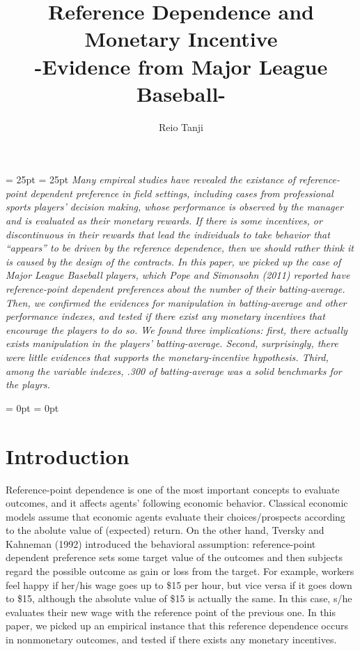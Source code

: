 \documentclass[dvipdfmx, 12pt]{article}
\begin{document}
\title{Reference Dependence and Monetary Incentive \\
-Evidence from Major League Baseball-}
\author{Reio Tanji}
\date{}
\maketitle

\leftskip = 25pt
\rightskip = 25pt
  \small
  \textit{
  Many empircal studies have revealed the existance of reference-point dependent preference in field settings, including cases from professional sports players' decision making, whose performance is observed by the manager and is evaluated as their monetary rewards. If there is some incentives, or discontinuous in their rewards that lead the individuals to take behavior that ``appears'' to be driven by the reference dependence, then we should rather think it is caused by the design of the contracts. In this paper, we picked up the case of Major League Baseball players, which Pope and Simonsohn (2011) reported have reference-point dependent preferences about the number of their batting-average. Then, we confirmed the evidences for manipulation in batting-average and other performance indexes, and tested if there exist any monetary incentives that encourage the players to do so. We found three implications: first, there actually exists manipulation in the players' batting-average. Second, surprisingly, there were little evidences that supports the monetary-incentive hypothesis. Third, among the variable indexes, .300 of batting-average was a solid benchmarks for the playrs.
  }

\leftskip = 0pt
\rightskip = 0pt
\normalsize


\section{Introduction}

Reference-point dependence is one of the most important concepts to evaluate outcomes, and it affects agents' following economic behavior. Classical economic models assume that economic agents evaluate their choices/prospects according to the abolute value of (expected) return. On the other hand, Tversky and Kahneman (1992) introduced the behavioral assumption: reference-point dependent preference sets some target value of the outcomes and then subjects regard the possible outcome as gain or loss from the target. For example, workers feel happy if her/his wage goes up to \$15 per hour, but vice versa if it goes down to \$15, although the absolute value of \$15 is actually the same. In this case, s/he evaluates their new wage with the reference point of the previous one. In this paper, we picked up an empirical instance that this reference dependence occurs in nonmonetary outcomes, and tested if there exists any monetary incentives.
\end{document}
